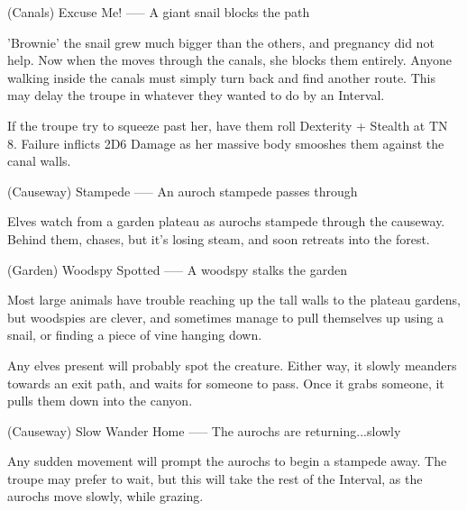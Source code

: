 (Canals) Excuse Me!
-----
{A giant snail blocks the path}

'Brownie' the snail grew much bigger than the others, and pregnancy did not help.
Now when the moves through the canals, she blocks them entirely.
Anyone walking inside the canals must simply turn back and find another route.
This may delay the troupe in whatever they wanted to do by an Interval.

If the troupe try to squeeze past her, have them roll Dexterity + Stealth at TN 8.
Failure inflicts 2D6 Damage as her massive body smooshes them against the canal walls.

(Causeway) Stampede
-----
{An auroch stampede passes through}

Elves watch from a garden plateau as aurochs stampede through the causeway.
Behind them,  chases, but it's losing steam, and soon retreats into the forest.

(Garden) Woodspy Spotted
-----
{A woodspy stalks the garden}

Most large animals have trouble reaching up the tall walls to the plateau gardens, but woodspies are clever, and sometimes manage to pull themselves up using a snail, or finding a piece of vine hanging down.

Any elves present will probably spot the creature.
Either way, it slowly meanders towards an exit path, and waits for someone to pass.
Once it grabs someone, it pulls them down into the canyon.

(Causeway) Slow Wander Home
-----
{The aurochs are returning...slowly}

Any sudden movement will prompt the aurochs to begin a stampede away.
The troupe may prefer to wait, but this will take the rest of the Interval, as the aurochs move slowly, while grazing.

